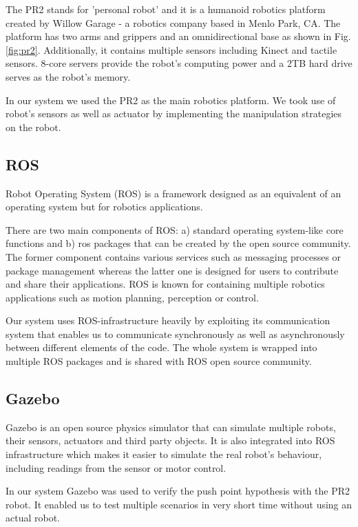 The PR2 stands for 'personal robot' and it is a humanoid robotics platform created by Willow Garage - a robotics company based in Menlo Park, CA. The platform has two arms and grippers and an omnidirectional base as shown in Fig. \ref{fig:pr2}. Additionally, it contains multiple sensors including Kinect and tactile sensors. 8-core servers provide the robot's computing power and a 2TB hard drive serves as the robot's memory.  

In our system we used the PR2 as the main robotics platform. We took use of robot's sensors as well as actuator by implementing the manipulation strategies on the robot.

\subsection{ROS}
Robot Operating System (ROS) is a framework designed as an equivalent of an operating system but for robotics applications. 

There are two main components of ROS: a) standard operating system-like core functions and b) ros packages that can be created by the open source community. The former component contains various services such as messaging processes or package management whereas the latter one is designed for users to contribute and share their applications. ROS is known for containing multiple robotics applications such as motion planning, perception or control.

Our system uses ROS-infrastructure heavily by exploiting its communication system that enables us to communicate synchronously as well as asynchronously between different elements of the code. The whole system is wrapped into multiple ROS packages and is shared with ROS open source community.




\subsection{Gazebo}
Gazebo is an open source physics simulator that can simulate multiple robots, their sensors, actuators and third party objects. It is also integrated into ROS infrastructure which makes it easier to simulate the real robot's behaviour, including readings from the sensor or motor control. 

In our system Gazebo was used to verify the push point hypothesis with the PR2 robot. It enabled us to test multiple scenarios in very short time without using an actual robot.


